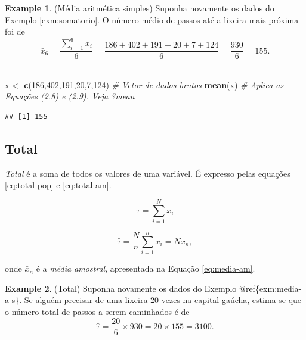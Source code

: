 \documentclass[
]{book}
\newenvironment{Shaded}{\begin{snugshade}}{\end{snugshade}}
\newcommand{\CommentTok}[1]{\textcolor[rgb]{0.56,0.35,0.01}{\textit{#1}}}
\newcommand{\DecValTok}[1]{\textcolor[rgb]{0.00,0.00,0.81}{#1}}
\newcommand{\KeywordTok}[1]{\textcolor[rgb]{0.13,0.29,0.53}{\textbf{#1}}}
\newcommand{\NormalTok}[1]{#1}
\newcommand{\StringTok}[1]{\textcolor[rgb]{0.31,0.60,0.02}{#1}}
\theoremstyle{definition}
\theoremstyle{definition}
\newtheorem{example}{Example}[chapter]
\theoremstyle{definition}
\theoremstyle{remark}
\begin{document}
\begin{example}
\protect\hypertarget{exm:media-a-s}{}{\label{exm:media-a-s} }(Média aritmética simples) Suponha novamente os dados do Exemplo \ref{exm:somatorio}. O número médio de passos até a lixeira mais próxima foi de \[\bar{x}_6 = \frac {\sum_{i=1}^6 x_i}{6} = \frac {186+402+191+20+7+124}{6} = \frac{930}{6} = 155.\]\\
\end{example}

\begin{Shaded}
\begin{Highlighting}[]
\NormalTok{x \textless{}{-}}\StringTok{ }\KeywordTok{c}\NormalTok{(}\DecValTok{186}\NormalTok{,}\DecValTok{402}\NormalTok{,}\DecValTok{191}\NormalTok{,}\DecValTok{20}\NormalTok{,}\DecValTok{7}\NormalTok{,}\DecValTok{124}\NormalTok{)      }\CommentTok{\# Vetor de dados brutos}
\KeywordTok{mean}\NormalTok{(x)                           }\CommentTok{\# Aplica as Equações (2.8) e (2.9). Veja ?mean}
\end{Highlighting}
\end{Shaded}

\begin{verbatim}
## [1] 155
\end{verbatim}

\hypertarget{total}{%
\subsection{Total}\label{total}}

\emph{Total} é a soma de todos os valores de uma variável. É expresso pelas equações \eqref{eq:total-pop} e \eqref{eq:total-am}.

\begin{equation}
\tau = \sum_{i=1}^N x_i
\label{eq:total-pop}
\end{equation}

\begin{equation}
\hat{\tau} = \dfrac{N}{n} \sum_{i=1}^n x_i = N \bar{x}_{n},
\label{eq:total-am}
\end{equation}

onde \(\bar{x}_{n}\) é a \emph{média amostral}, apresentada na Equação \eqref{eq:media-am}.

\begin{example}
\protect\hypertarget{exm:total}{}{\label{exm:total} }(Total) Suponha novamente os dados do Exemplo @ref\{exm:media-a-s\}. Se alguém precisar de uma lixeira 20 vezes na capital gaúcha, estima-se que o número total de passos a serem caminhados é de \[\hat{\tau} = \dfrac{20}{6} \times 930 = 20 \times 155 = 3100.\]
\end{example}
\end{document}
